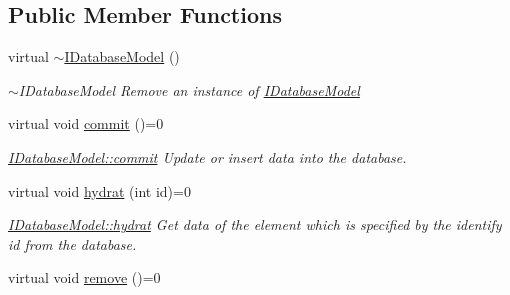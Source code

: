\subsection*{Public Member Functions}
\begin{DoxyCompactItemize}
\item 
\hypertarget{classIDatabaseModel_a85b66486922fe56a18c897cf93ed33a2}{virtual \hyperlink{classIDatabaseModel_a85b66486922fe56a18c897cf93ed33a2}{$\sim$\+I\+Database\+Model} ()}\label{classIDatabaseModel_a85b66486922fe56a18c897cf93ed33a2}

\begin{DoxyCompactList}\small\item\em $\sim$\+I\+Database\+Model Remove an instance of \hyperlink{classIDatabaseModel}{I\+Database\+Model} \end{DoxyCompactList}\item 
\hypertarget{classIDatabaseModel_a2d4fd70557c1815d100df17ba0751cbd}{virtual void \hyperlink{classIDatabaseModel_a2d4fd70557c1815d100df17ba0751cbd}{commit} ()=0}\label{classIDatabaseModel_a2d4fd70557c1815d100df17ba0751cbd}

\begin{DoxyCompactList}\small\item\em \hyperlink{classIDatabaseModel_a2d4fd70557c1815d100df17ba0751cbd}{I\+Database\+Model\+::commit} Update or insert data into the database. \end{DoxyCompactList}\item 
virtual void \hyperlink{classIDatabaseModel_a25e44ed10a75976f86e14d34aea02c37}{hydrat} (int id)=0
\begin{DoxyCompactList}\small\item\em \hyperlink{classIDatabaseModel_a25e44ed10a75976f86e14d34aea02c37}{I\+Database\+Model\+::hydrat} Get data of the element which is specified by the identify {\itshape id} from the database. \end{DoxyCompactList}\item 
\hypertarget{classIDatabaseModel_a11d94697daf0af2b44fbe37ef831ea94}{virtual void \hyperlink{classIDatabaseModel_a11d94697daf0af2b44fbe37ef831ea94}{remove} ()=0}\label{classIDatabaseModel_a11d94697daf0af2b44fbe37ef831ea94}


\end{DoxyCompactItemize}

